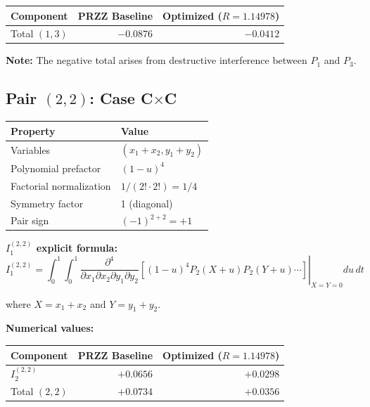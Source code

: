 \documentclass[11pt]{article}
\begin{document}
\begin{center}
\begin{tabular}{lrr}
\toprule
Component & PRZZ Baseline & Optimized ($R=1.14978$) \\
\midrule
Total $(1,3)$ & $-0.0876$ & $-0.0412$ \\
\bottomrule
\end{tabular}
\end{center}

\textbf{Note:} The negative total arises from destructive interference between $P_1$ and $P_3$.

\subsection{Pair $(2,2)$: Case C$\times$C}

\begin{center}
\begin{tabular}{ll}
\toprule
Property & Value \\
\midrule
Variables & $(x_1+x_2, y_1+y_2)$ \\
Polynomial prefactor & $(1-u)^4$ \\
Factorial normalization & $1/(2! \cdot 2!) = 1/4$ \\
Symmetry factor & 1 (diagonal) \\
Pair sign & $(-1)^{2+2} = +1$ \\
\bottomrule
\end{tabular}
\end{center}

\textbf{$I_1^{(2,2)}$ explicit formula:}
\begin{equation}
I_1^{(2,2)} = \int_0^1 \int_0^1 \left.\frac{\partial^4}{\partial x_1 \partial x_2 \partial y_1 \partial y_2}\left[(1-u)^4 P_2(X+u) P_2(Y+u) \cdots\right]\right|_{X=Y=0} du\, dt
\end{equation}

where $X = x_1+x_2$ and $Y = y_1+y_2$.

\textbf{Numerical values:}

\begin{center}
\begin{tabular}{lrr}
\toprule
Component & PRZZ Baseline & Optimized ($R=1.14978$) \\
\midrule
$I_2^{(2,2)}$ & $+0.0656$ & $+0.0298$ \\
Total $(2,2)$ & $+0.0734$ & $+0.0356$ \\
\bottomrule
\end{tabular}
\end{center}
\end{document}
